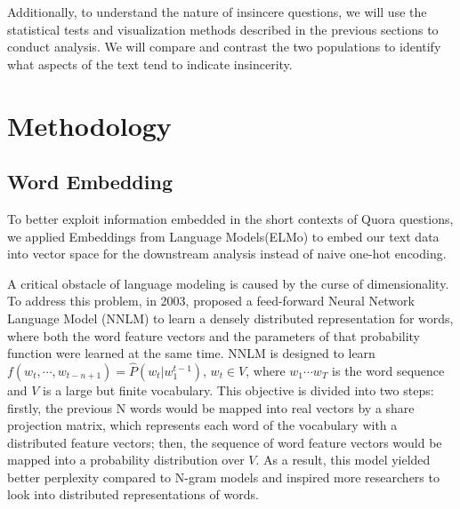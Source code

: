 \documentclass[12pt]{diazessay} %
\begin{document}
Additionally, to understand the nature of insincere questions, we will use the statistical tests and visualization methods described in the previous sections to conduct analysis. We will compare and contrast the two populations to identify what aspects of the text tend to indicate insincerity. 


\section{Methodology}
\subsection{Word Embedding}

To better exploit information embedded in the short contexts of Quora questions, we applied Embeddings from Language Models(ELMo) to embed our text data into vector space for the downstream analysis instead of naive one-hot encoding.

A critical obstacle of language modeling is caused by the curse of dimensionality. To address this problem, in 2003, \citet{bengio2003neural} proposed a feed-forward Neural Network Language Model (NNLM) to learn a densely distributed representation\citep{hinton1986learning} for words, where both the word feature vectors and the parameters of that probability function were learned at the same time. NNLM is designed to learn $f \left( w _ { t } , \cdots , w _ { t - n + 1 } \right) = \hat { P } \left( w _ { t } | w _ { 1 } ^ { t - 1 } \right)$, $w _ { t } \in V$, where $w_1 \cdots w_T$ is the word sequence and $V$ is a large but finite vocabulary. This objective is divided into two steps: firstly, the previous N words would be mapped into real vectors by a share projection matrix, which represents each word of the vocabulary with a distributed feature vectors; then, the sequence of word feature vectors would be mapped into a probability distribution over $V$. As a result, this model yielded better perplexity compared to N-gram models and inspired more researchers to look into distributed representations of words.
\end{document}
